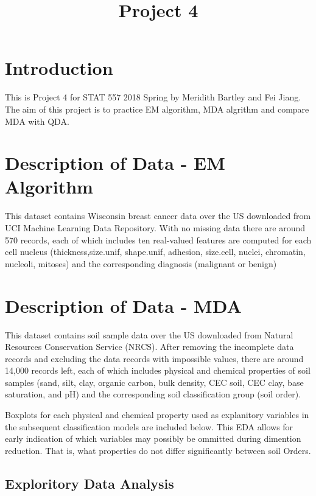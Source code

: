 \documentclass[]{article}
\title{Project 4}
\author{}
\date{}
\begin{document}
\maketitle

\section{Introduction}\label{introduction}

This is Project 4 for STAT 557 2018 Spring by Meridith Bartley and Fei
Jiang. The aim of this project is to practice EM algorithm, MDA algrithm
and compare MDA with QDA.

\section{Description of Data - EM
Algorithm}\label{description-of-data---em-algorithm}

This dataset contains Wisconsin breast cancer data over the US
downloaded from UCI Machine Learning Data Repository. With no missing
data there are around 570 records, each of which includes ten
real-valued features are computed for each cell nucleus
(thickness,size.unif, shape.unif, adhesion, size.cell, nuclei,
chromatin, nucleoli, mitoses) and the corresponding diagnosis (malignant
or benign)

\section{Description of Data - MDA}\label{description-of-data---mda}

This dataset contains soil sample data over the US downloaded from
Natural Resources Conservation Service (NRCS). After removing the
incomplete data records and excluding the data records with impossible
values, there are around 14,000 records left, each of which includes
physical and chemical properties of soil samples (sand, silt, clay,
organic carbon, bulk density, CEC soil, CEC clay, base saturation, and
pH) and the corresponding soil classification group (soil order).

Boxplots for each physical and chemical property used as explanitory
variables in the subsequent classification models are included below.
This EDA allows for early indication of which variables may possibly be
ommitted during dimention reduction. That is, what properties do not
differ significantly between soil Orders.

\subsection{Exploritory Data Analysis}\label{exploritory-data-analysis}
\end{document}
